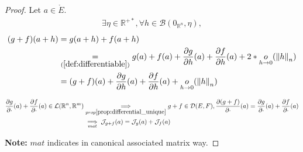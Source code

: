 \documentclass[11pt,en]{elegantpaper}
\newcommand{\norm}[1]{\left\lVert#1\right\rVert}
\newcommand{\Real}{\mathbb{R}}
\begin{document}
\begin{proof}
  Let $a \in \mathring{E}$.
  \begin{equation*}
    \begin{gathered}
      \exists \eta \in \Real^{+*}, \forall h \in \mathcal{B}(0_{\Real^n},\eta),
    \end{gathered}
  \end{equation*}
  \begin{equation*}
    \begin{split}
      (g + f)(a+h) & = g(a+h) + f(a+h) \\
      & \underset{(\ref{def:differentiable})}{=} g(a) + f(a) + \frac{\partial g}{\partial h}(a) + \frac{\partial f}{\partial h}(a) + 2 * \underset{h \to 0}o(\norm h _n) \\
      & = (g + f)(a) + \frac{\partial g}{\partial h}(a) + \frac{\partial f}{\partial h}(a) + \underset{h \to 0}o(\norm h _n)
    \end{split}
  \end{equation*}

  \begin{equation*}
    \begin{split}
      \frac{\partial g}{\partial \cdot}(a) + \frac{\partial f}{\partial \cdot}(a) \in \mathcal{L}(\Real^n, \Real^m)
      & \underset{prop\ref{prop:differential_unique}}\implies g + f \in \mathcal{D}(E,F), \frac{\partial (g + f)}{\partial \cdot}(a) = \frac{\partial g}{\partial \cdot}(a) + \frac{\partial f}{\partial \cdot}(a) \\
      & \underset{mat}\implies \mathcal{J}_{g + f}(a) = \mathcal{J}_{g}(a) + \mathcal{J}_{f}(a)
    \end{split}
  \end{equation*} \par

  \textbf{Note:} $mat$ indicates in canonical associated matrix way. \par
\end{proof}
\end{document}
